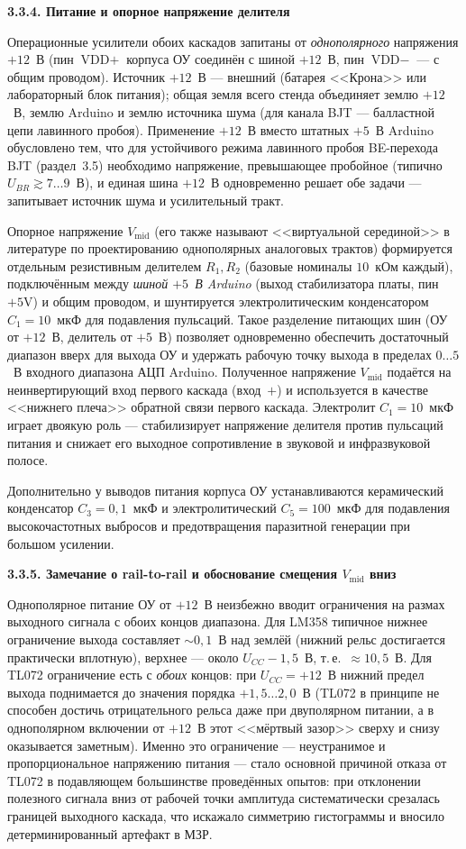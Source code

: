 \textbf{3.3.4. Питание и опорное напряжение делителя}

Операционные усилители обоих каскадов запитаны от \emph{однополярного} напряжения
$+12$~В (пин $\text{VDD}{+}$ корпуса ОУ соединён с шиной $+12$~В, пин
$\text{VDD}{-}$ --- с общим проводом). Источник $+12$~В --- внешний (батарея
<<Крона>> или лабораторный блок питания); общая земля всего стенда объединяет
землю $+12$~В, землю Arduino и землю источника шума (для канала BJT ---
балластной цепи лавинного пробоя). Применение $+12$~В вместо штатных $+5$~В
Arduino обусловлено тем, что для устойчивого режима лавинного пробоя BE-перехода
BJT (раздел~3.5) необходимо напряжение, превышающее пробойное (типично
$U_{BR}\gtrsim 7\ldots 9$~В), и единая шина $+12$~В одновременно решает обе
задачи --- запитывает источник шума и усилительный тракт.

Опорное напряжение $V_\mathrm{mid}$ (его также называют <<виртуальной серединой>>
в литературе по проектированию однополярных аналоговых трактов) формируется
отдельным резистивным делителем $R_1,R_2$ (базовые номиналы $10$~кОм каждый),
подключённым между \emph{шиной $+5$~В Arduino} (выход стабилизатора платы, пин
$\text{+5V}$) и общим проводом, и шунтируется электролитическим конденсатором
$C_1=10$~мкФ для подавления пульсаций. Такое разделение питающих шин (ОУ от
$+12$~В, делитель от $+5$~В) позволяет одновременно обеспечить достаточный
диапазон вверх для выхода ОУ и удержать рабочую точку выхода в пределах
$0\ldots 5$~В входного диапазона АЦП Arduino. Полученное напряжение $V_\mathrm{mid}$
подаётся на неинвертирующий вход первого каскада (вход~$+$) и используется в
качестве <<нижнего плеча>> обратной связи первого каскада. Электролит
$C_1=10$~мкФ играет двоякую роль --- стабилизирует напряжение делителя против
пульсаций питания и снижает его выходное сопротивление в звуковой и
инфразвуковой полосе.

Дополнительно у выводов питания корпуса ОУ устанавливаются керамический
конденсатор $C_3=0{,}1$~мкФ и электролитический $C_5=100$~мкФ для подавления
высокочастотных выбросов и предотвращения паразитной генерации при большом
усилении.

\textbf{3.3.5. Замечание о rail-to-rail и обоснование смещения $V_\mathrm{mid}$ вниз}

Однополярное питание ОУ от $+12$~В неизбежно вводит ограничения на размах
выходного сигнала с обоих концов диапазона. Для LM358 типичное нижнее ограничение
выхода составляет $\sim 0{,}1$~В над землёй (нижний рельс достигается практически
вплотную), верхнее --- около $U_{CC}-1{,}5$~В, т.\,е.\ ${\approx}10{,}5$~В. Для
TL072 ограничение есть с \emph{обоих} концов: при $U_{CC}=+12$~В нижний предел
выхода поднимается до значения порядка $+1{,}5\ldots 2{,}0$~В (TL072 в принципе
не способен достичь отрицательного рельса даже при двуполярном питании, а в
однополярном включении от $+12$~В этот <<мёртвый зазор>> сверху и снизу
оказывается заметным). Именно это ограничение --- неустранимое и пропорциональное
напряжению питания --- стало основной причиной отказа от TL072 в подавляющем
большинстве проведённых опытов: при отклонении полезного сигнала вниз от
рабочей точки амплитуда систематически срезалась границей выходного каскада,
что искажало симметрию гистограммы и вносило детерминированный артефакт в МЗР.

